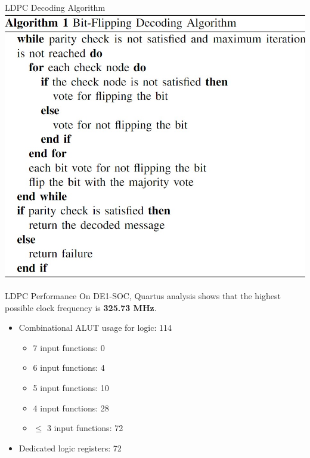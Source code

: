 \documentclass{beamer}
\begin{document}
\begin{frame}{LDPC Decoding Algorithm}
  \includegraphics[scale=0.3]{Images/Bit_Flipping_Algorithm.jpg}
\end{frame}

\begin{frame}{LDPC Performance}
  On DE1-SOC, Quartus analysis shows that the highest possible clock frequency is \textbf{325.73 MHz}.

  \begin{itemize}
    \item Combinational ALUT usage for logic: 114 \begin{itemize}
      \item 7 input functions: 0
      \item 6 input functions: 4
      \item 5 input functions: 10
      \item 4 input functions: 28
      \item $\leq$ 3 input functions: 72
    \end{itemize}
    \item Dedicated logic registers: 72
  \end{itemize}
\end{frame}
\end{document}
